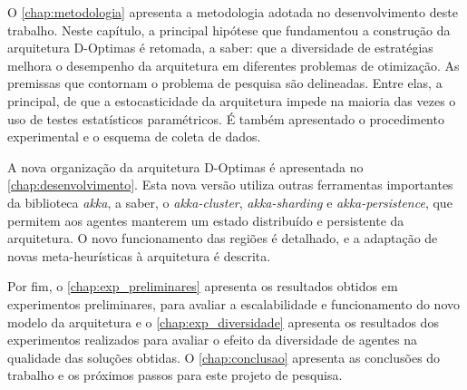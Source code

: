 O \autoref{chap:metodologia} apresenta a metodologia adotada no desenvolvimento deste trabalho. Neste capítulo, a principal hipótese que fundamentou a construção da arquitetura D-Optimas é retomada, a saber: que a diversidade de estratégias melhora o desempenho da arquitetura em diferentes problemas de otimização. As premissas que contornam o problema de pesquisa são delineadas. Entre elas, a principal, de que a estocasticidade da arquitetura impede na maioria das vezes o uso de testes estatísticos paramétricos. É também apresentado o procedimento experimental e o esquema de coleta de dados.

A nova organização da arquitetura D-Optimas é apresentada no \autoref{chap:desenvolvimento}. Esta nova versão utiliza outras ferramentas importantes da biblioteca \textit{akka}, a saber, o \textit{akka-cluster}, \textit{akka-sharding} e \textit{akka-persistence}, que permitem aos agentes manterem um estado distribuído e persistente da arquitetura. O novo funcionamento das regiões é detalhado, e a adaptação de novas meta-heurísticas à arquitetura é descrita.

Por fim, o \autoref{chap:exp_preliminares} apresenta os resultados obtidos em experimentos preliminares, para avaliar a escalabilidade e funcionamento do novo modelo da arquitetura e o \autoref{chap:exp_diversidade} apresenta os resultados dos experimentos realizados para avaliar o efeito da diversidade de agentes na qualidade das soluções obtidas. O \autoref{chap:conclusao} apresenta as conclusões do trabalho e os próximos passos para este projeto de pesquisa. 
